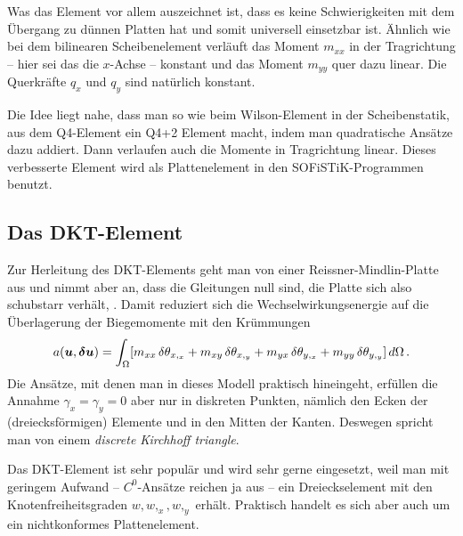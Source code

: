 Was das Element vor allem auszeichnet ist, dass es keine Schwierigkeiten mit dem \"{U}bergang zu d\"{u}nnen Platten hat und somit universell einsetzbar ist. \"{A}hnlich wie bei dem bilinearen Scheibenelement verl\"{a}uft das Moment $m_{xx}$ in der Tragrichtung -- hier sei das die $x$-Achse -- konstant und das Moment $m_{yy}$ quer dazu linear. Die Querkr\"{a}fte $q_x$ und $q_y$ sind nat\"{u}rlich konstant.

Die Idee liegt nahe, dass man so wie beim Wilson-Element in der Scheibenstatik, aus dem Q4-Element ein Q4+2 Element macht, indem man quadratische Ans\"{a}tze dazu addiert. Dann verlaufen auch die Momente in Tragrichtung linear. Dieses verbesserte Element wird als Plattenelement in den SOFiSTiK-Programmen benutzt.

{\textcolor{sectionTitleBlue}{\subsection{Das DKT-Element}}}

Zur Herleitung des DKT-Elements geht man von einer Reissner-Mindlin-Platte aus und nimmt aber an, dass die Gleitungen null sind, die Platte sich also schubstarr verh\"{a}lt, \cite{Batoz1}. Damit reduziert sich die Wechselwirkungsenergie auf die \"{U}berlagerung der Biegemomente mit den Kr\"{u}mmungen
\begin{align}
a(\mbox{\boldmath $u$}, \mbox{\boldmath $\delta$} \mbox{\boldmath $u$}) = \int_\Omega [m_{xx}\, \delta \theta_{x,_x} + m_{xy}\, \delta\theta_{x,_y} +
m_{yx} \,\delta \theta_{y,_x} + m_{yy}\, \delta \theta_{y,_y}] \,d\Omega \,.
\end{align}
Die Ans\"{a}tze, mit denen man in dieses Modell praktisch hineingeht, erf\"{u}llen die Annahme $\gamma_x = \gamma_y = 0$ aber nur in diskreten Punkten, n\"{a}mlich den  Ecken der (dreiecksf\"{o}rmigen) Elemente und in den Mitten der Kanten. Deswegen spricht man von einem {\em discrete Kirchhoff triangle}.

Das DKT-Element ist sehr popul\"{a}r und wird sehr gerne eingesetzt, weil man mit geringem Aufwand -- $C^0$-Ans\"{a}tze reichen ja aus -- ein Dreieckselement mit den Knotenfreiheitsgraden $w, w,_x, w,_y$ erh\"{a}lt. Praktisch handelt es sich aber auch um ein nichtkonformes Plattenelement.

